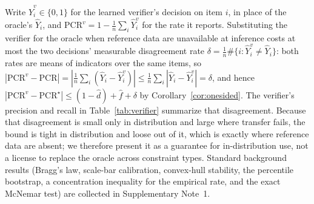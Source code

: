 \documentclass[pdflatex,sn-nature]{sn-jnl}
\begin{document}
\noindent Write $\hat Y^v_i\in\{0,1\}$ for the learned verifier's decision on item $i$, in
place of the oracle's $\hat Y_i$, and $\mathrm{PCR}^v=1-\frac{1}{n}\sum_i\hat Y^v_i$ for the rate
it reports. Substituting the verifier for the oracle when reference data are unavailable at
inference costs at most the two decisions' measurable disagreement rate
$\delta=\frac{1}{n}\#\{i:\hat Y^v_i\neq\hat Y_i\}$: both rates are means of indicators over the
same items, so $|\mathrm{PCR}^v-\mathrm{PCR}|=|\frac{1}{n}\sum_i(\hat Y_i-\hat Y^v_i)|
\le\frac{1}{n}\sum_i|\hat Y_i-\hat Y^v_i|=\delta$, and hence
$|\mathrm{PCR}^v-\mathrm{PCR}^\star|\le(1-\hat d)+\hat f+\delta$ by
Corollary~\ref{cor:onesided}. The verifier's precision and recall in
Table~\ref{tab:verifier} summarize that disagreement. Because that disagreement is
small only in distribution and large where transfer fails, the bound is tight in
distribution and loose out of it, which is exactly where reference data are absent; we
therefore present it as a guarantee for in-distribution use, not a license to replace the
oracle across constraint types. Standard background results
(Bragg's law, scale-bar calibration, convex-hull stability, the percentile bootstrap, a
concentration inequality for the empirical rate, and the exact McNemar test) are
collected in Supplementary Note~1.
\end{document}
